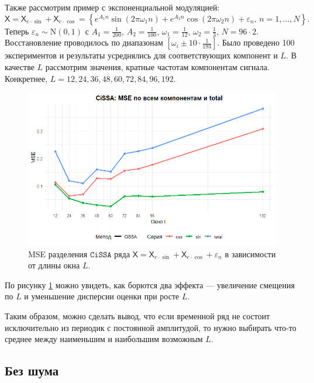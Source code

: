 \documentclass[12pt, specialist, subf
]{disser}
\theoremstyle{definition}
\newcommand{\CISSA}{\texttt{CiSSA}}
\newcommand{\TS}{\mathsf{X}}
\begin{document}
Также рассмотрим пример с экспоненциальной модуляцией: 
\[ 
\TS = \TS_{e\cdot\sin} + \TS_{e\cdot\cos} = 
\left\{
	e^{A_1 n } \sin(2\pi \omega_1 n ) + e^{A_2 n} \cos(2\pi \omega_2 n ) + \varepsilon_n, \, n = 1, \dots, N 
\right\}.
\] 
Теперь $\varepsilon_n \sim \mathrm N(0, 1)$ с $A_1 = \frac{1}{200}$, $A_2 = \frac{1}{100}$, $\omega_1 = \frac{1}{12}$, $\omega_2 = \frac{1}{3}$, $N = 96 \cdot 2$. Восстановление проводилось по диапазонам $[\omega_i \pm 10 \cdot \frac{1}{193}]$. Было проведено 100 экспериментов и результаты усреднялись для соответствующих компонент и $L$. В качестве $L$ рассмотрим значения, кратные частотам компонентам сигнала. Конкретнее,  $L = 12, 24, 36, 48, 60, 72, 84, 96, 192$.

\begin{figure}[H]
	\centering
	\includegraphics[width=1\textwidth]{img/cissa_errors_plot_expcos_noised.png}
	\caption{MSE разделения $\CISSA$ ряда $\TS = \TS_{e\cdot\sin} + \TS_{e\cdot\cos} + \varepsilon_n$ в зависимости от длины окна $L$.}
	\label{fig:cissa_error_expcos_noised_depends_on_L}
\end{figure}


По рисунку \ref{fig:cissa_error_expcos_noised_depends_on_L} можно увидеть, как борются два эффекта — увеличение смещения по $L$ и уменьшение дисперсии оценки при росте $L$.

Таким образом, можно сделать вывод, что если временной ряд не состоит исключительно из периодик с постоянной амплитудой, то нужно выбирать что-то среднее между наименьшим и наибольшим возможным $L$.

\subsection{Без шума}
\end{document}
